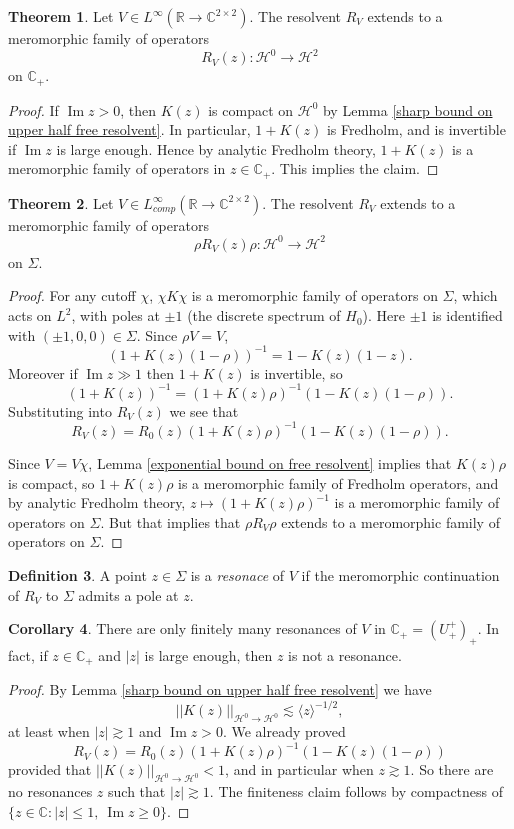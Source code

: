 \documentclass[12pt]{report}
\newcommand{\RR}{\mathbb{R}}
\newcommand{\CC}{\mathbb{C}}
\renewcommand{\Im}{\operatorname{Im}}
\newcommand{\dfn}[1]{\emph{#1}\index{#1}}
\theoremstyle{definition}
\newtheorem{theorem}{Theorem}[chapter]
\newtheorem{corollary}[theorem]{Corollary}
\newtheorem{definition}[theorem]{Definition}
\begin{document}
\begin{theorem}
Let $V \in L^\infty(\RR \to \CC^{2 \times 2})$.
The resolvent $R_V$ extends to a meromorphic family of operators
$$R_V(z): \mathcal H^0 \to \mathcal H^2$$
on $\CC_+$.
\end{theorem}
\begin{proof}
If $\Im z > 0$, then $K(z)$ is compact on $\mathcal H^0$ by Lemma \ref{sharp bound on upper half free resolvent}. In particular, $1 + K(z)$ is Fredholm, and is invertible if $\Im z$ is large enough.
Hence by analytic Fredholm theory, $1 + K(z)$ is a meromorphic family of operators in $z \in \CC_+$. This implies the claim.
\end{proof}

\begin{theorem}
Let $V \in L^\infty_{comp}(\RR \to \CC^{2 \times 2})$.
The resolvent $R_V$ extends to a meromorphic family of operators
$$\rho R_V(z) \rho: \mathcal H^0 \to \mathcal H^2$$
on $\Sigma$.
\end{theorem}
\begin{proof}
For any cutoff $\chi$, $\chi K \chi$ is a meromorphic family of operators on $\Sigma$, which acts on $L^2$, with poles at $\pm 1$ (the discrete spectrum of $H_0$). Here $\pm 1$ is identified with $(\pm 1, 0, 0) \in \Sigma$.
Since $\rho V = V$,
$$(1 + K(z)(1-\rho))^{-1} = 1 - K(z)(1 - z).$$
Moreover if $\Im z \gg 1$ then $1 + K(z)$ is invertible, so
$$(1 + K(z))^{-1} = (1 + K(z)\rho)^{-1}(1 - K(z)(1 - \rho)).$$
Substituting into $R_V(z)$ we see that
$$R_V(z) = R_0(z)(1 + K(z)\rho)^{-1}(1 - K(z)(1 - \rho)).$$

Since $V = V\chi$, Lemma \ref{exponential bound on free resolvent} implies that $K(z)\rho$ is compact, so $1 + K(z)\rho$ is a meromorphic family of Fredholm operators, and by analytic Fredholm theory, $z \mapsto (1 + K(z)\rho)^{-1}$ is a meromorphic family of operators on $\Sigma$.
But that implies that $\rho R_V \rho$ extends to a meromorphic family of operators on $\Sigma$.
\end{proof}

\begin{definition}
A point $z \in \Sigma$ is a \dfn{resonace} of $V$ if the meromorphic continuation of $R_V$ to $\Sigma$ admits a pole at $z$.
\end{definition}

\begin{corollary}
There are only finitely many resonances of $V$ in $\CC_+ = (U_+^+)_+$. In fact, if $z \in \CC_+$ and $|z|$ is large enough, then $z$ is not a resonance.
\end{corollary}
\begin{proof}
By Lemma \ref{sharp bound on upper half free resolvent} we have
$$||K(z)||_{\mathcal H^0 \to \mathcal H^0} \lesssim \langle z \rangle^{-1/2},$$
at least when $|z| \gtrsim 1$ and $\Im z > 0$.
We already proved
$$R_V(z) = R_0(z)(1 + K(z)\rho)^{-1}(1 - K(z)(1 - \rho))$$
provided that $||K(z)||_{\mathcal H^0 \to \mathcal H^0} < 1$, and in particular when $z \gtrsim 1$. So there are no resonances $z$ such that $|z| \gtrsim 1$. The finiteness claim follows by compactness of $\{z \in \CC: |z| \leq 1, ~\Im z \geq 0\}$.
\end{proof}
\end{document}
